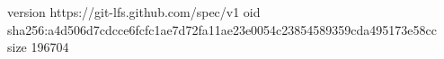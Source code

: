 version https://git-lfs.github.com/spec/v1
oid sha256:a4d506d7cdcce6fcfc1ae7d72fa11ae23e0054c23854589359cda495173e58cc
size 196704
